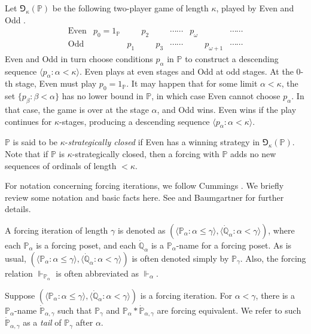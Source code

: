 \documentclass[a4paper,12pt,reqno,oneside]{amsart}
\theoremstyle{plain}
\newcommand{\mbb}{\mathbb}
\begin{document}
Let $\Game_\kappa ( \mbb{P} )$ be the following two-player game of length $\kappa$, played by Even and Odd .
\[
\begin{array}{c|cccccccccc}
\mbox{Even} & p_0 = 1_\mbb{P} & & p_2 & & \cdots\cdots & p_\omega & & \cdots\cdots \\
\hline
\mbox{Odd} & & p_1 & & p_3 & \cdots\cdots & & p_{\omega + 1} & \cdots\cdots
\end{array}
\]
Even and Odd in turn choose conditions $p_\alpha$ in $\mbb{P}$ to construct a descending sequence $\langle p_\alpha : \alpha < \kappa \rangle$. Even plays at even stages and Odd at odd stages. At the $0$-th stage, Even must play $p_0 = 1_\mbb{P}$. It may happen that for some limit $\alpha < \kappa$, the set $\{ p_\beta : \beta < \alpha \}$ has no lower bound in $\mbb{P}$, in which case Even cannot choose $p_\alpha$. In that case, the game is over at the stage $\alpha$, and Odd wins. Even wins if the play  continues for $\kappa$-stages, producing a descending sequence $\langle p_\alpha : \alpha < \kappa \rangle$.

$\mbb{P}$ is said to be $\kappa$-\emph{strategically closed} if Even has a winning strategy in $\Game_\kappa ( \mbb{P} )$. Note that if $\mbb{P}$ is $\kappa$-strategically closed, then a forcing with $\mbb{P}$ adds no new sequences of ordinals of length $< \kappa$.

For notation concerning forcing iterations, we follow Cummings \cite{C}. We briefly review some notation and basic facts here. See \cite{C} and Baumgartner \cite{B} for further details.

A forcing iteration of length $\gamma$ is denoted as $(\langle \mbb{P}_\alpha : \alpha \leq \gamma \rangle , \langle \dot{\mbb{Q}}_\alpha : \alpha < \gamma \rangle)$, where each $\mbb{P}_\alpha$ is a forcing poset, and each $\dot{\mbb{Q}}_\alpha$ is a $\mbb{P}_\alpha$-name for a forcing poset. As is usual, $( \langle \mbb{P}_\alpha : \alpha \leq \gamma \rangle , \langle \dot{\mbb{Q}}_\alpha : \alpha < \gamma \rangle )$ is often denoted simply by  $\mbb{P}_\gamma$. Also, the forcing relation $\Vdash_{\mbb{P}_\alpha}$ is often abbreviated as $\Vdash_\alpha$.

Suppose $( \langle \mbb{P}_\alpha : \alpha \leq \gamma \rangle , \langle \dot{\mbb{Q}}_\alpha : \alpha < \gamma \rangle )$ is a forcing iteration. For $\alpha < \gamma$, there is a $\mbb{P}_\alpha$-name $\dot{\mbb{P}}_{\alpha , \gamma}$ such that $\mbb{P}_\gamma$ and $\mbb{P}_\alpha * \dot{\mbb{P}}_{\alpha , \gamma}$ are forcing equivalent. We refer to such $\dot{\mbb{P}}_{\alpha , \gamma}$ as a \emph{tail} of $\mbb{P}_\gamma$ after $\alpha$.
\end{document}
